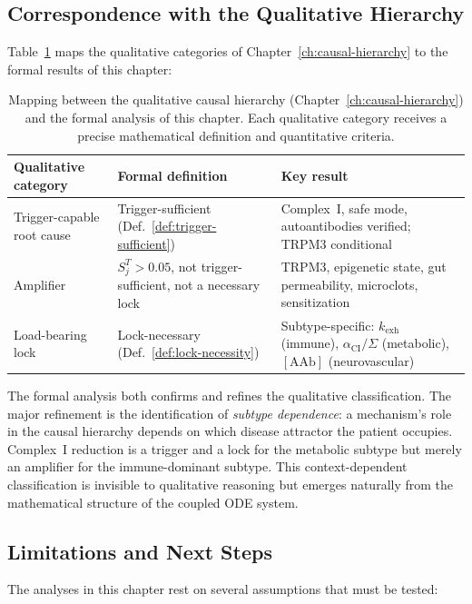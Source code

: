 \subsection*{Correspondence with the Qualitative Hierarchy}

Table~\ref{tab:qualitative-formal-mapping} maps the qualitative categories of Chapter~\ref{ch:causal-hierarchy} to the formal results of this chapter:

\begin{table}[htbp]
\centering
\caption{Mapping between the qualitative causal hierarchy (Chapter~\ref{ch:causal-hierarchy}) and the formal analysis of this chapter. Each qualitative category receives a precise mathematical definition and quantitative criteria.}
\label{tab:qualitative-formal-mapping}
\begin{tabular}{p{2.5cm}p{4cm}p{5.5cm}}
\hline
Qualitative category & Formal definition & Key result \\
\hline
Trigger-capable root cause & Trigger-sufficient (Def.~\ref{def:trigger-sufficient}) & Complex~I, safe mode, autoantibodies verified; TRPM3 conditional \\
Amplifier & $S_j^T > 0.05$, not trigger-sufficient, not a necessary lock & TRPM3, epigenetic state, gut permeability, microclots, sensitization \\
Load-bearing lock & Lock-necessary (Def.~\ref{def:lock-necessity}) & Subtype-specific: $k_{\text{exh}}$ (immune), $\alpha_{\text{CI}}/\Sigma$ (metabolic), $[\text{AAb}]$ (neurovascular) \\
\hline
\end{tabular}
\end{table}

The formal analysis both confirms and refines the qualitative classification. The major refinement is the identification of \emph{subtype dependence}: a mechanism's role in the causal hierarchy depends on which disease attractor the patient occupies. Complex~I reduction is a trigger and a lock for the metabolic subtype but merely an amplifier for the immune-dominant subtype. This context-dependent classification is invisible to qualitative reasoning but emerges naturally from the mathematical structure of the coupled ODE system.

\subsection*{Limitations and Next Steps}

The analyses in this chapter rest on several assumptions that must be tested:

